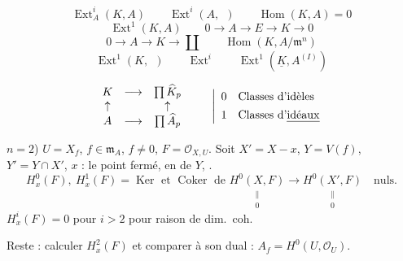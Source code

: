 \documentclass[11pt,a4paper]{article}
\begin{document}
\[
  \operatorname{Ext}^i_A(K, A) \qquad \operatorname{Ext}^i(A,\ \ )
  \qquad \operatorname{Hom}(K, A) = 0
\]
 \quad {}
\[
  \operatorname{Ext}^1(K, A) \qquad 0 \longrightarrow A \longrightarrow E
  \longrightarrow K \longrightarrow 0
\]
\[
  0 \longrightarrow A \longrightarrow K \longrightarrow \coprod
  \qquad \operatorname{Hom}(K, A/\mathfrak{m}^n)
\]
\[
  \operatorname{Ext}^1(K,\ \ ) \qquad \operatorname{Ext}^i \qquad
  \operatorname{Ext}^1(\underline{K}, A^{(I)})
\]

\[
\begin{array}{ccc}
  K & \longrightarrow & \prod \widehat{K}_p\\
  \uparrow & & \uparrow\\
  A & \longrightarrow & \prod \widehat{A}_p
\end{array}
\qquad
\left|
\begin{array}{ll}
  0 & \text{Classes d'idèles}\\[4pt]
  1 & \text{Classes d'\uncertain{idéaux}}
\end{array}
\right.
\]

$n = 2$) \quad $U = X_f$, $f \in \mathfrak{m}_A$, $f \neq 0$, \quad $F =
\mathcal{O}_{X,U}$. Soit $X' = X - x$,  $Y = V(f)$, $Y' = Y \cap
X'$, $x$ : le point fermé, en  de $Y$, \ill{}.
\[
  H^0_x(F),\ H^1_x(F) = \operatorname{Ker} \text{ et } \operatorname{Coker}
  \text{ de } \underset{\substack{\|\\ 0}}{H^0(X, F)} \longrightarrow
  \underset{\substack{\|\\ 0}}{H^0(X', F)} \quad \text{nuls}.
\]
$H^i_x(F) = 0$ pour $i > 2$ pour raison de dim.\ coh.

Reste : calculer $H^2_x(F)$ et comparer à son dual : $A_f =
H^0(U, \mathcal{O}_U)$.
\end{document}
